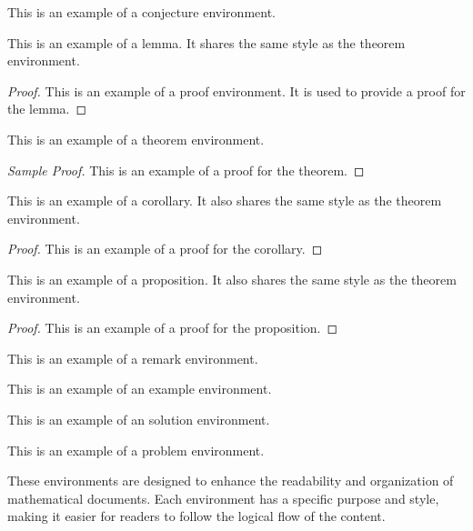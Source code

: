 \begin{conjecture}
  This is an example of a conjecture environment.
\end{conjecture}

\begin{lemma}
  This is an example of a lemma. It shares the same style as the theorem environment.
\end{lemma}
\begin{proof}
  This is an example of a proof environment. It is used to provide a proof for the lemma.
\end{proof}

\begin{theorem}
  This is an example of a theorem environment. 
\end{theorem}
\begin{proof}[Sample Proof]
  This is an example of a proof for the theorem.
\end{proof}

\begin{corollary}
  This is an example of a corollary. It also shares the same style as the theorem environment.
\end{corollary}
\begin{proof}
  This is an example of a proof for the corollary.
\end{proof}

\begin{proposition}
  This is an example of a proposition. It also shares the same style as the theorem environment.
\end{proposition}
\begin{proof}
  This is an example of a proof for the proposition.
\end{proof}

\begin{remark}
  This is an example of a remark environment.
\end{remark}

\begin{example}
  This is an example of an example environment.
\end{example}

\begin{solution}
  This is an example of an solution environment.
\end{solution}

\begin{problem}
  This is an example of a problem environment.
\end{problem}

These environments are designed to enhance the readability and organization of mathematical documents. 
Each environment has a specific purpose and style, making it easier for readers to follow the logical flow of the content.